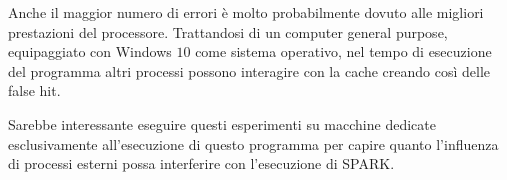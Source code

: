 					Anche il maggior numero di errori è molto probabilmente dovuto alle migliori prestazioni del processore. Trattandosi di un computer general purpose, equipaggiato con Windows $10$ come sistema operativo, nel tempo di esecuzione del programma altri processi possono interagire con la cache creando così delle false hit. 
					
					Sarebbe interessante eseguire questi esperimenti su macchine dedicate esclusivamente all'esecuzione di questo programma per capire quanto l'influenza di processi esterni possa interferire con l'esecuzione di SPARK. 
					